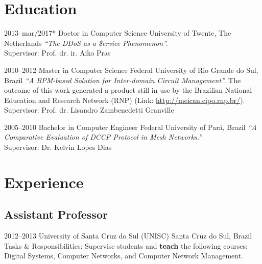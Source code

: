 \documentclass[print]{friggeri-cv-linux} %
\begin{document}


\section{Education}

\begin{entrylist}

\entry
{2013--mar/2017*}
{Doctor {\normalfont in Computer Science}}
{University of Twente, The Netherlands}
{\emph{``The DDoS as a \$ervice Phenomenon''.} \\
Supervisor: Prof. dr. ir. Aiko Pras 
}	

\entry
{2010--2012}
{Master {\normalfont in Computer Science}}
{Federal University of Rio Grande do Sul, Brazil}
{\emph{``A BPM-based Solution for Inter-domain Circuit Management''.} The outcome of this work generated a product still in use by the Brazilian National Education and Research Network (RNP) (Link: \href{http://meican.cipo.rnp.br/}{http://meican.cipo.rnp.br/}).\\
Supervisor: Prof. dr. Lisandro Zambenedetti Granville}

\entry
{2005--2010}
{Bachelor {\normalfont in Computer Engineer}}
{Federal University of Par\'a, Brazil}
{\emph{``A Comparative Evaluation of DCCP Protocol in Mesh Networks.''} \\ 
Supervisor: Dr. Kelvin Lopes Dias
}

\end{entrylist}

\section{Experience}

\subsection{Assistant Professor}
\begin{entrylist}
\entry
{2012--2013}
{University of Santa Cruz do Sul (UNISC)}
{Santa Cruz do Sul, Brazil}
{Tasks \& Responsibilities: Supervise students and \textbf{teach} the following
courses: Digital Systems, Computer Networks, and Computer Network Management.}
\end{entrylist}
\end{document}
